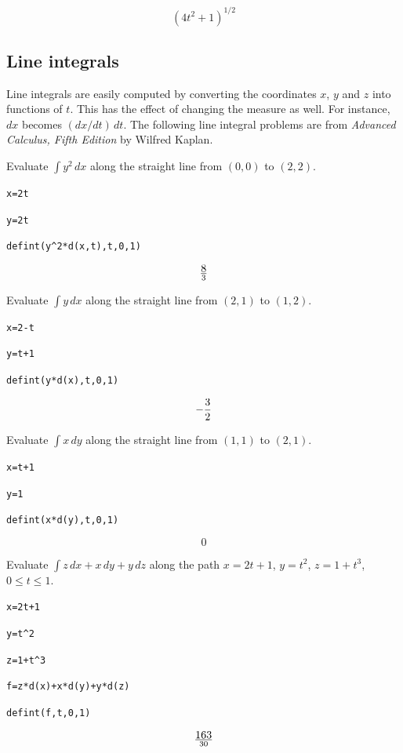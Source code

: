 $$(4t^2+1)^{1/2}$$

\subsection{Line integrals}

Line integrals are easily computed by
converting the coordinates $x$, $y$ and $z$ into functions of $t$.
This has the effect of changing the measure as well.
For instance, $dx$ becomes $(dx/dt)\,dt$.
The following line integral problems are from
{\it Advanced Calculus, Fifth Edition} by Wilfred Kaplan.

\medskip
\noindent
Evaluate $\int y^2\,dx$ along the straight
line from $(0,0)$ to $(2,2)$.

\medskip
\verb$x=2t$

\verb$y=2t$

\verb$defint(y^2*d(x,t),t,0,1)$

$$8\over3$$

\medskip
\noindent
Evaluate $\int y\,dx$ along the straight line from
$(2,1)$ to $(1,2)$.

\medskip
\verb$x=2-t$

\verb$y=t+1$

\verb$defint(y*d(x),t,0,1)$

$$-{3\over2}$$

\medskip
\noindent
Evaluate $\int x\,dy$ along the straight line from
$(1,1)$ to $(2,1)$.

\medskip
\verb$x=t+1$

\verb$y=1$

\verb$defint(x*d(y),t,0,1)$

$$0$$

\medskip
\noindent
Evaluate $\int z\,dx+x\,dy+y\,dz$
along the path
$x=2t+1$, $y=t^2$, $z=1+t^3$, $0\le t\le 1$.

\medskip
\verb$x=2t+1$

\verb$y=t^2$

\verb$z=1+t^3$

\verb$f=z*d(x)+x*d(y)+y*d(z)$

\verb$defint(f,t,0,1)$

$$163\over30$$

